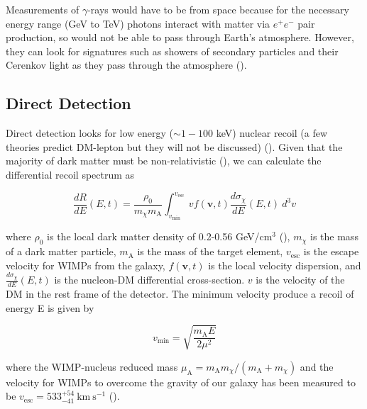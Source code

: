 Measurements of $\gamma$-rays would have to be from space because for the necessary energy range (GeV to TeV) photons interact
with matter via $e^{+}e^{-}$ pair production, so would not be able to pass through Earth's atmosphere.  However,
they can look for signatures such as showers of secondary particles and their Cerenkov
light as they pass through the atmosphere ().



\subsection{Direct Detection} \label{subsec:direct}
Direct detection looks for low energy ($\sim 1-100$ keV) nuclear recoil (a few theories predict DM-lepton
but they will not be discussed) ().  Given that the majority of dark matter must be
non-relativistic (), we can calculate the differential recoil spectrum as 

\begin{equation} \label{eq:dr_de}
\frac{dR}{dE}(E, t) = \frac{\rho_{0}}{m_{\chi}m_{\mathrm{A}}} \int_{v_{\mathrm{min}}}^{v_{\mathrm{esc}}}
v f(\boldsymbol{v}, t) \frac{d\sigma_{\chi}}{dE}(E, t)\ d^{3}v
\end{equation}

\noindent where $\rho_{0}$ is the local dark matter density of 0.2-0.56 GeV/cm$^{3}$ (), $m_{\chi}$ is
the mass of a
dark matter particle, $m_{\mathrm{A}}$ is the mass of the target element, $v_{\mathrm{esc}}$ is the escape velocity for WIMPs from the galaxy,
$f(\boldsymbol{v}, t)$ is the local velocity dispersion, and $\frac{d\sigma_{\chi}}{dE}(E, t)$ is the nucleon-DM differential
cross-section.  $v$ is the velocity of the DM in the rest frame of the detector.  The minimum velocity produce
a recoil of energy E is given by

\begin{equation}
v_{\mathrm{min}} = \sqrt{\frac{m_{\mathrm{A}} E}{2 \mu^{2}}}
\end{equation}

\noindent where the WIMP-nucleus reduced mass $\mu_{\mathrm{A}} = m_{\mathrm{A}} m_{\chi} /( m_{\mathrm{A}} + m_{\chi})$
and the velocity for
WIMPs to overcome the gravity of our galaxy has been measured to be $v_{\mathrm{esc}} = 533_{-41}^{+54}\ \mathrm{km\ s^{-1}}$
().

